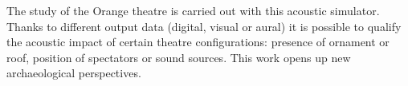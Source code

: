 The study of the Orange theatre is carried out with this acoustic simulator. Thanks to different output data (digital, visual or aural) it is possible to qualify the acoustic impact of certain theatre configurations: presence of ornament or roof, position of spectators or sound sources. This work opens up new archaeological perspectives.



